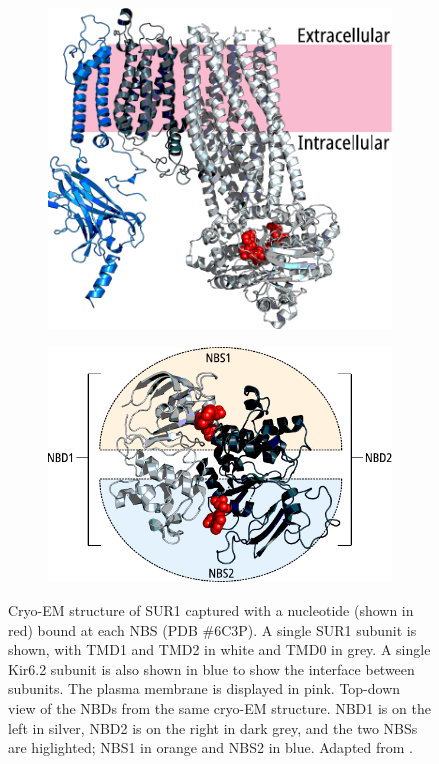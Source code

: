 \begin{figure}[hbtp]
	\centering
	\begin{subfigure}[t]{0.4\textwidth}
		\caption{}\label{ch1fig:sur_struct}
		\centering
		\includegraphics[width=\textwidth]{sur_structure.pdf}
	\end{subfigure}
	\hfill
	\begin{subfigure}[t]{0.5\textwidth}
		\caption{}\label{ch1fig:nbd_struct}
		\centering
		\includegraphics[width=\textwidth]{nbd_structure.pdf}
	\end{subfigure}
	\caption[Structure of SUR1]{
		{\bf{}}
		 Cryo-EM structure of SUR1 captured with a nucleotide (shown in red) bound at each NBS (PDB \#6C3P).
		A single SUR1 subunit is shown, with TMD1 and TMD2 in white and TMD0 in grey.
		A single Kir6.2 subunit is also shown in blue to show the interface between subunits.
		The plasma membrane is displayed in pink.
		 Top-down view of the NBDs from the same cryo-EM structure.
		NBD1 is on the left in silver, NBD2 is on the right in dark grey, and the two NBSs are higlighted; NBS1 in orange and NBS2 in blue.
		Adapted from \textcite{puljung_cryo-electron_2018}.
	}
\end{figure}

